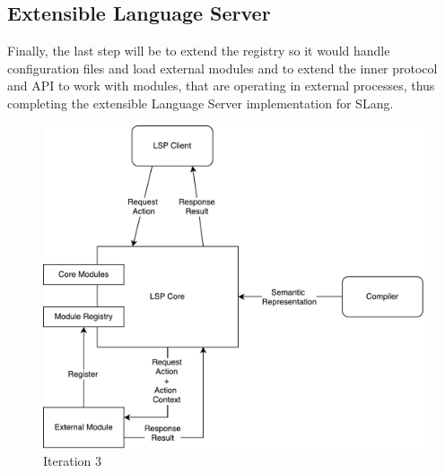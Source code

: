 \subsection{Extensible Language Server}
Finally, the last step will be to extend the registry so it would handle configuration files
and load external modules and to extend the inner protocol and API to work with modules, that are operating
in external processes, thus completing the extensible Language Server implementation for SLang.

\begin{figure}[H]
    \centering
    \includegraphics[width=.6\textwidth]{figs/ls_iteration_4.pdf}
    \caption{Iteration 3}
\end{figure}



 




